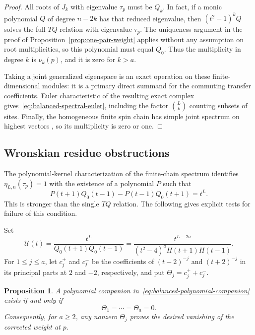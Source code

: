 \documentclass[11pt]{article}
\newtheorem{proposition}{Proposition}[section]
\theoremstyle{definition}
\begin{document}
\begin{proof}
All roots of $J_k$ with eigenvalue $\tau_p$ must be $Q_k$. In fact,
if a monic polynomial $Q$ of degree $n-2k$ has that reduced
eigenvalue, then $(t^2-1)^kQ$ solves the full $TQ$ relation with
eigenvalue $\tau_p$. The uniqueness argument in the proof of
Proposition~\ref{prop:one-pair-weight} applies without any assumption
on root multiplicities, so this polynomial must equal $Q_0$.
Thus the multiplicity in degree $k$ is $\nu_k(p)$, and it is zero
for $k>a$.

Taking a joint generalized eigenspace is an exact operation on these
finite-dimensional modules: it is a primary direct summand for the
commuting transfer coefficients. Euler characteristic of the resulting
exact complex gives~\eqref{eq:balanced-spectral-euler}, including
the factor $\binom Lk$ counting subsets of sites. Finally, the
homogeneous finite spin chain has simple joint spectrum on highest
vectors \cite[Theorem~12.1.1]{MTV2009}, so its multiplicity is zero
or one.
\end{proof}

\subsection{Wronskian residue obstructions}
\label{sec:balanced-wronskian-obstructions}

The polynomial-kernel characterization of the finite-chain spectrum
\cite[Section~12.8]{MTV2009} identifies
$\eta_{L,n}(\tau_p)=1$ with the existence of a polynomial $P$ such
that
\begin{equation}\label{eq:balanced-polynomial-companion}
 P(t+1)Q_0(t-1)-P(t-1)Q_0(t+1)=t^L.
\end{equation}
This is stronger than the single $TQ$ relation. The following gives
explicit tests for failure of this condition.

Set
\[
 \mathcal U(t)=\frac{t^L}{Q_0(t+1)Q_0(t-1)}
 =\frac{t^{L-2a}}{(t^2-4)^aH(t+1)H(t-1)}.
\]
For $1\le j\le a$, let $c_j^+$ and $c_j^-$ be the coefficients of
$(t-2)^{-j}$ and $(t+2)^{-j}$ in its principal parts at $2$ and
$-2$, respectively, and put $\Theta_j=c_j^++c_j^-$.

\begin{proposition}\label{prop:balanced-residue-obstructions}
A polynomial companion in~\eqref{eq:balanced-polynomial-companion}
exists if and only if
\[
 \Theta_1=\cdots=\Theta_a=0.
\]
Consequently, for $a\ge2$, any nonzero $\Theta_j$ proves the desired
vanishing of the corrected weight at $p$.
\end{proposition}
\end{document}
